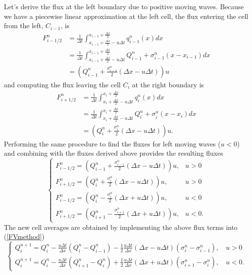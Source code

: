 %
Let's derive the flux at the left boundary due to positive moving waves. Because we have a piecewise linear approximation at the left cell, the flux entering the cell from the left, $C_{i-1}$, is
%
\begin{align*}
F_{i-1/2}^n &= \frac{1}{\Delta t} \int_{x_{i-1} + \frac{\Delta x}{2} - u \Delta t}^{x_{i-1} + \frac{\Delta x}{2}} q_{i-1}^n(x) dx \nonumber\\
&= \frac{1}{\Delta t} \int_{x_{i-1} + \frac{\Delta x}{2} - u \Delta t}^{x_{i-1} + \frac{\Delta x}{2}} Q_{i-1}^n + \sigma_{i-1}^n (x-x_{i-1}) dx \nonumber \\
&= \left( Q_{i-1}^n + \frac{\sigma_{i-1}^n}{2} (\Delta x - u \Delta t) \right) u
\end{align*}
%
and computing the flux leaving the cell $C_i$ at the right boundary is
%
\begin{align*}
F_{i+1/2}^n &= \frac{1}{\Delta t} \int_{x_i + \frac{\Delta x}{2} - u \Delta t}^{x_i + \frac{\Delta x}{2}} q_i^n(x) dx \nonumber\\
&= \frac{1}{\Delta t} \int_{x_i + \frac{\Delta x}{2} - u \Delta t}^{x_i + \frac{\Delta x}{2}} Q_i^n + \sigma_i^n (x-x_i) dx \nonumber\\
&= \left( Q_i^n + \frac{\sigma_{i}^n}{2} (\Delta x - u \Delta t) \right) u.
\end{align*}
%
Performing the same procedure to find the fluxes for left moving waves ($u<0$) and combining with the fluxes derived above provides the resulting fluxes
%
\begin{equation*}
\left\{
\begin{array}{cc}
F_{i-1/2}^n = \left( Q_{i-1}^n + \frac{\sigma_{i-1}^n}{2} (\Delta x - u \Delta t) \right) u, & u>0\\
F_{i+1/2}^n = \left( Q_i^n + \frac{\sigma_{i}^n}{2} (\Delta x - u \Delta t) \right) u, & u>0\\
F_{i-1/2}^n = \left( Q_{i}^n - \frac{\sigma_{i}^n}{2} (\Delta x + u \Delta t) \right) u, & u<0\\
F_{i+1/2}^n = \left( Q_{i+1}^n - \frac{\sigma_{i+1}^n}{2} (\Delta x + u \Delta t) \right) u, & u<0.
\end{array}
\right.
\end{equation*}
%
The new cell averages are obtained by implementing the above flux terms into (\ref{FVmethod})
%
\begin{equation}
\label{secondOrdFV}
\left\{
\begin{array}{cc}
Q_i^{n+1} = Q_i^n - \frac{u \Delta t}{\Delta x} (Q_i^n - Q_{i-1}^n) - \frac{1}{2} \frac{u \Delta t}{\Delta x} (\Delta x - u \Delta t) (\sigma_i^n - \sigma_{i-1}^n), \, & u > 0\\
Q_i^{n+1} = Q_i^n - \frac{u \Delta t}{\Delta x} (Q_{i+1}^n - Q_i^n) + \frac{1}{2} \frac{u \Delta t}{\Delta x} (\Delta x + u \Delta t) (\sigma_{i+1}^n - \sigma_i^n), \, & u < 0.
\end{array}
\right.
\end{equation}
